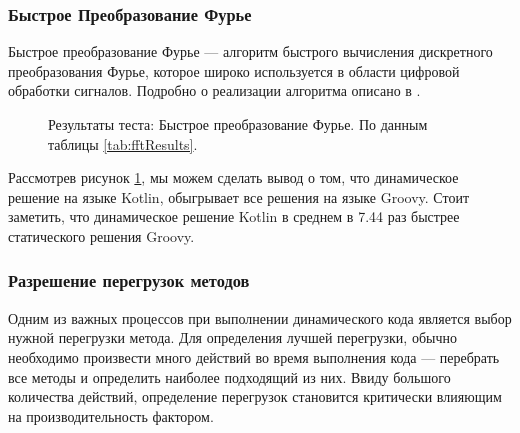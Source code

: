 \subsubsection{Быстрое Преобразование Фурье}

Быстрое преобразование Фурье --- алгоритм быстрого вычисления дискретного преобразования Фурье, которое широко используется в области цифровой обработки сигналов. Подробно о реализации алгоритма описано в \cite{algo:dasgypta2014algo}.



\begin{figure}
\caption{\label{graph:fftResults}Результаты теста: Быстрое преобразование Фурье. По данным таблицы \ref{tab:fftResults}.}
\end{figure}


Рассмотрев рисунок \ref{graph:fftResults}, мы можем сделать вывод о том, что динамическое решение на языке Kotlin, обыгрывает все решения на языке Groovy. %
Стоит заметить, что динамическое решение Kotlin в среднем в 7.44 раз быстрее статического решения Groovy.


\subsubsection{Разрешение перегрузок методов}
\label{sec:benchOverloadsResolv}

Одним из важных процессов при выполнении динамического кода является выбор нужной перегрузки метода. Для определения лучшей перегрузки, обычно необходимо произвести много действий во время выполнения кода --- перебрать все методы и определить наиболее подходящий из них. Ввиду большого количества действий, определение перегрузок становится критически влияющим на производительность фактором.



